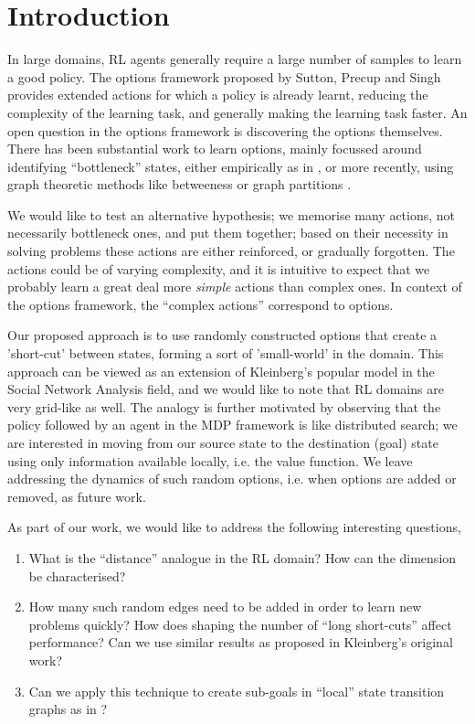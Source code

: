 \section{Introduction}
\label{sec:intro}

In large domains, RL agents generally require a large number of samples to
learn a good policy. The options framework proposed by Sutton, Precup and Singh \cite{SuttonPrecupSingh1998}
provides extended actions for which a policy is already learnt, reducing the
complexity of the learning task, and generally making the learning task faster.
An open question in the options framework is discovering the options
themselves.  There has been substantial work to learn options, mainly focussed
around identifying ``bottleneck'' states, either empirically as in \cite{Stolle}, or
more recently, using graph theoretic methods like betweeness \cite{Simsek} or
graph partitions \cite{Simsek2005}.

We would like to test an alternative hypothesis; we memorise many actions,
not necessarily bottleneck ones, and put them together; based on their
necessity in solving problems these actions are either reinforced, or gradually
forgotten.  The actions could be of varying complexity, and it is intuitive to
expect that we probably learn a great deal more {\em simple} actions than
complex ones. In context of the options framework, the ``complex actions''
correspond to options.

Our proposed approach is to use randomly constructed options that create a
'short-cut' between states, forming a sort of 'small-world' in the domain. This
approach can be viewed as an extension of Kleinberg's popular model
\cite{Kleinberg} in the Social Network Analysis field, and we would like to note
that RL domains are very grid-like as well. The analogy is further motivated by
observing that the policy followed by an agent in the MDP framework is like
distributed search; we are interested in moving from our source state to the
destination (goal) state using only information available locally, i.e. the
value function. We leave addressing the dynamics of such random options, i.e.
when options are added or removed, as future work.

As part of our work, we would like to address the following interesting questions,
\begin{enumerate}
\item
    What is the ``distance'' analogue in the RL domain? How can the dimension
    be characterised?
\item
    How many such random edges need to be added in order to learn new problems
    quickly? How does shaping the number of ``long short-cuts'' affect
    performance? Can we use similar results as proposed in Kleinberg's original
    work?
\item
    Can we apply this technique to create sub-goals in ``local'' state transition
    graphs as in \cite{Simsek2005}?
\end{enumerate}

